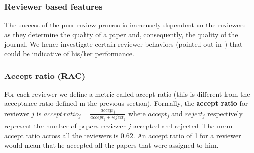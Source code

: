 \noindent
\subsubsection{Reviewer based features}
\label{reviewer_analysis}

The success of the peer-review process is immensely dependent on the reviewers as they determine the quality of a paper and, consequently, the quality of the journal. We hence investigate certain reviewer behaviors (pointed out in~\cite{sikdar2016anomalies}) that could  be indicative of his/her performance.

\subsubsection*{Accept ratio (RAC)} For each reviewer we define a metric called accept ratio (this is different from the acceptance ratio defined in the previous section). Formally, the {\bf accept ratio} for reviewer $j$ is $accept\,ratio_{j}=\frac{accept_{j}}{accept_{j} + reject_{j}}$ 
where $accept_{j}$ and $reject_{j}$ respectively represent the number of papers reviewer $j$ accepted and rejected. The mean accept ratio across all the reviewers is $0.62$. An accept ratio of 1 for a reviewer would mean that he accepted all the papers that were assigned to him.

